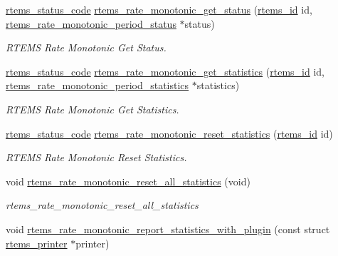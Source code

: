 \begin{DoxyCompactItemize}
\mbox{\hyperlink{group__ClassicStatus_ga545d41846817eaba6143d52ee4d9e9fe}{rtems\+\_\+status\+\_\+code}} \mbox{\hyperlink{group__ClassicRateMon_ga6bec49e7ccb1b6074438e301c0f1f92e}{rtems\+\_\+rate\+\_\+monotonic\+\_\+get\+\_\+status}} (\mbox{\hyperlink{group__ClassicTasks_gab20892b814dced7dd4e5b9bf42becd57}{rtems\+\_\+id}} id, \mbox{\hyperlink{structrtems__rate__monotonic__period__status}{rtems\+\_\+rate\+\_\+monotonic\+\_\+period\+\_\+status}} $\ast$status)
\begin{DoxyCompactList}\small\item\em R\+T\+E\+MS Rate Monotonic Get Status. \end{DoxyCompactList}\item 
\mbox{\hyperlink{group__ClassicStatus_ga545d41846817eaba6143d52ee4d9e9fe}{rtems\+\_\+status\+\_\+code}} \mbox{\hyperlink{group__ClassicRateMon_ga56f6fb057c562aaf77959bbb3b9d0762}{rtems\+\_\+rate\+\_\+monotonic\+\_\+get\+\_\+statistics}} (\mbox{\hyperlink{group__ClassicTasks_gab20892b814dced7dd4e5b9bf42becd57}{rtems\+\_\+id}} id, \mbox{\hyperlink{structrtems__rate__monotonic__period__statistics}{rtems\+\_\+rate\+\_\+monotonic\+\_\+period\+\_\+statistics}} $\ast$statistics)
\begin{DoxyCompactList}\small\item\em R\+T\+E\+MS Rate Monotonic Get Statistics. \end{DoxyCompactList}\item 
\mbox{\hyperlink{group__ClassicStatus_ga545d41846817eaba6143d52ee4d9e9fe}{rtems\+\_\+status\+\_\+code}} \mbox{\hyperlink{group__ClassicRateMon_gafc3dfca5d5f9edc1d931da6d7c309386}{rtems\+\_\+rate\+\_\+monotonic\+\_\+reset\+\_\+statistics}} (\mbox{\hyperlink{group__ClassicTasks_gab20892b814dced7dd4e5b9bf42becd57}{rtems\+\_\+id}} id)
\begin{DoxyCompactList}\small\item\em R\+T\+E\+MS Rate Monotonic Reset Statistics. \end{DoxyCompactList}\item 
void \mbox{\hyperlink{group__ClassicRateMon_gacd99140676caf91d1fd3c6fd95e6a9c8}{rtems\+\_\+rate\+\_\+monotonic\+\_\+reset\+\_\+all\+\_\+statistics}} (void)
\begin{DoxyCompactList}\small\item\em rtems\+\_\+rate\+\_\+monotonic\+\_\+reset\+\_\+all\+\_\+statistics \end{DoxyCompactList}\item 
void \mbox{\hyperlink{group__ClassicRateMon_ga062540df1e5b9d2c99ac1f372491d5e8}{rtems\+\_\+rate\+\_\+monotonic\+\_\+report\+\_\+statistics\+\_\+with\+\_\+plugin}} (const struct \mbox{\hyperlink{structrtems__printer}{rtems\+\_\+printer}} $\ast$printer)

\end{DoxyCompactItemize}

